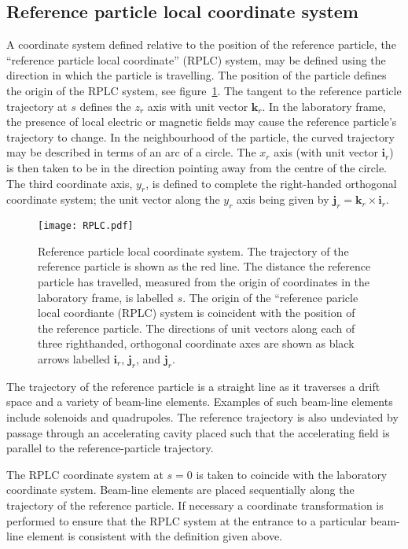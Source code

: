 \subsection{Reference particle local coordinate system}

A coordinate system defined relative to the position of the reference
particle, the ``reference particle local coordinate'' (RPLC) system,
may be defined using the direction in which the particle is
travelling. 
The position of the particle defines the origin of the RPLC system,
see figure~\ref{fig:RPLC}.
The tangent to the reference particle trajectory at $s$ defines the
$z_r$ axis with unit vector $\bm{k}_r$.
In the laboratory frame, the presence of local electric or magnetic
fields may cause the reference particle's trajectory to change.
In the neighbourhood of the particle, the curved trajectory may be
described in terms of an arc of a circle.
The $x_r$ axis (with unit vector $\bm{i}_r$) is then
taken to be in the direction pointing away from the centre of the
circle. 
The third coordinate axis, $y_r$, is defined to complete the
right-handed orthogonal coordinate system; the unit vector along the
$y_r$ axis being given by
$\bm{j}_r = \bm{k}_r \times \bm{i}_r$.
\begin{figure}
  \begin{center}
    \texttt{[image: RPLC.pdf]}
  \end{center}
  \caption{
    Reference particle local coordinate system.
    The trajectory of the reference particle is shown as the red line.
    The distance the reference particle has travelled, measured from
    the origin of coordinates in the laboratory frame, is labelled
    $s$.
    The origin of the ``reference paricle local coordiante (RPLC)
    system is coincident with the position of the reference particle.
    The directions of unit vectors along each of three righthanded,
    orthogonal coordinate axes are shown as black arrows labelled
    $\bm{i}_r$, $\bm{j}_r$, and $\bm{j}_r$. 
  }
  \label{fig:RPLC}
\end{figure}

The trajectory of the reference particle is a straight line as it
traverses a drift space and a variety of beam-line elements.
Examples of such beam-line elements include solenoids and
quadrupoles.
The reference trajectory is also undeviated by passage through an
accelerating cavity placed such that the accelerating field is 
parallel to the reference-particle trajectory.

The RPLC coordinate system at $s=0$ is taken to coincide with the
laboratory coordinate system.
Beam-line elements are placed sequentially along the trajectory of the
reference particle.
If necessary a coordinate transformation is performed to ensure that
the RPLC system at the entrance to a particular beam-line element is
consistent with the definition given above.

